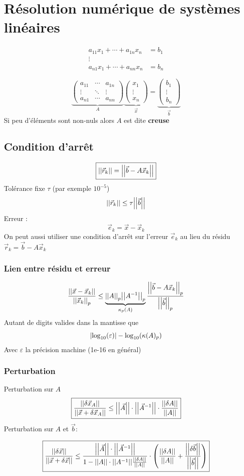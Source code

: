 \documentclass[resume]{subfiles}
\begin{document}
    \section{Résolution numérique de systèmes linéaires}
    \begin{align*}
    a_{11}x_1+\cdots+a_{1n}x_n &=b_1\\
    \vdots \\
    a_{n1}x_1 + \cdots + a_{nn}x_n &= b_n
    \end{align*}
    
    $$\underbrace{\begin{pmatrix}
    a_{11} & \cdots & a_{1n}\\
    \vdots & \ddots & \vdots\\
    a_{n1} & \cdots & a_{nn}
    \end{pmatrix}}_{A}\underbrace{\begin{pmatrix}
    x_1\\\vdots\\x_n
    \end{pmatrix}}_{\vec{x}}=\underbrace{\begin{pmatrix}
    b_1\\\vdots\\b_n
    \end{pmatrix}}_{\vec{b}}$$
	Si peu d'éléments sont non-nuls alors $A$ est dite \textbf{creuse}
	\subsection{Condition d'arrêt}
	$$\boxed{\abs{\abs{\vec{r}_k}}=\abs{\abs{\vec{b}-A\vec{x}_k}}}$$
	Tolérance fixe $\tau$ (par exemple $10^{-5}$)
	$$\abs{\abs{\vec{r}_k}}\leq \tau\abs{\abs{\vec{b}}}$$
	Erreur :
	$$\vec{e}_k=\vec{x}-\vec{x}_k$$
	On peut aussi utiliser une condition d'arrêt sur l'erreur $\vec{e}_k$ au lieu du résidu $\vec{r}_k=\vec{b}-A\vec{x}_k$
	\subsubsection{Lien entre résidu et erreur}
	$$\frac{\abs{\abs{\vec{x}-\vec{x}_k}}}{\abs{\abs{\vec{x}_k}}_p}\leq \underbrace{\abs{\abs{A}}_p\abs{\abs{A^{-1}}}_p}_{\kappa_p(A)}\frac{\abs{\abs{\vec{b}-A\vec{x}_k}}_p}{\abs{\abs{\vec{b}}}_p}$$
	Autant de digits valides dans la mantisse que
	$$\abs{\log_{10}(\varepsilon)}-\log_{10}(\kappa(A)_p)$$
	Avec $\varepsilon$ la précision machine (1e-16 en général)
	\subsubsection{Perturbation}
	Perturbation sur $A$
	$$\boxed{\frac{\abs{\abs{\delta\vec{x}_A}}}{\abs{\abs{\vec{x}+\delta \vec{x}_A}}}\leq \abs{\abs{\vec{A}}}\cdot\abs{\abs{\vec{A}^{-1}}}\cdot\frac{\abs{\abs{\delta A}}}{\abs{\abs{A}}}}$$
	Perturbation sur $A$ et $\vec{b}$:
	\begin{small}
	$$\boxed{\frac{\abs{\abs{\delta\vec{x}}}}{\abs{\abs{\vec{x}+\delta \vec{x}}}}\leq \frac{\abs{\abs{\vec{A}}}\cdot\abs{\abs{\vec{A}^{-1}}}}{1-\abs{\abs{A}}\cdot \abs{\abs{A^{-1}}}\frac{\abs{\abs{\delta A}}}{\abs{\abs{A}}}}\cdot\left(\frac{\abs{\abs{\delta A}}}{\abs{\abs{A}}}+\frac{\abs{\abs{\delta \vec{b}}}}{\abs{\abs{\vec{b}}}}\right)}$$
	\end{small}
\end{document}
